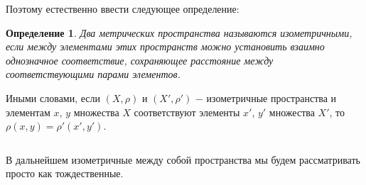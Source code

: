 \documentclass{article}
\newtheorem{definition}{Определение}[section]
\begin{document}
Поэтому естественно ввести следующее определение:

\begin{definition}
Два метрических пространства называются изометричными, если между элементами этих пространств можно установить взаимно однозначное соответствие, сохраняющее расстояние между соответствующими парами элементов.
\end{definition}

Иными словами, если \((X, \rho)\) и \((X', \rho')\) \(-\) изометричные пространства и элементам \(x\), \(y\) множества \(X\) соответствуют элементы \(x'\), \(y'\) множества \(X'\), то \(\rho(x, y) = \rho'(x', y')\).

\(\)

В дальнейшем изометричные между собой пространства мы будем рассматривать просто как тождественные.
\end{document}

